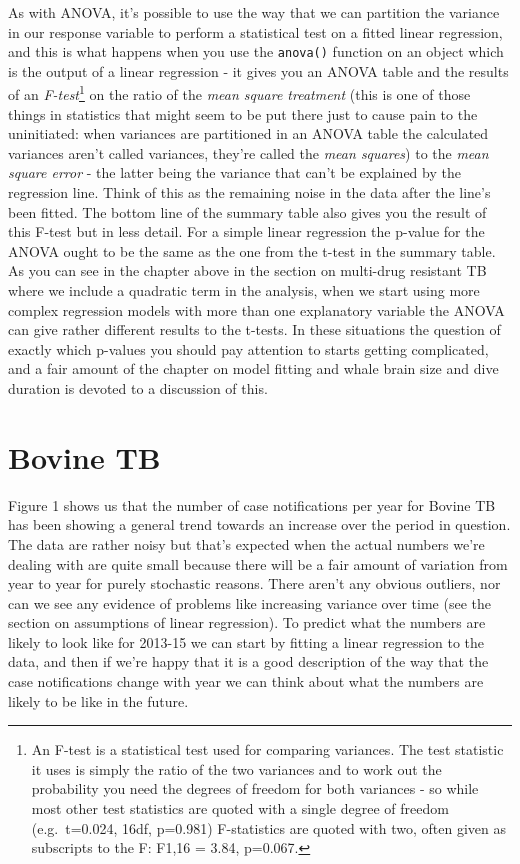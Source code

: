 \documentclass[
]{book}
\begin{document}
As with ANOVA, it's possible to use the way that we can partition the variance in our response variable to perform a statistical test on a fitted linear regression, and this is what happens when you use the \texttt{anova()} function on an object which is the output of a linear regression - it gives you an ANOVA table and the results of an \emph{F-test}\footnote{An F-test is a statistical test used for comparing variances. The test statistic it uses is simply the ratio of the two variances and to work out the probability you need the degrees of freedom for both variances - so while most other test statistics are quoted with a single degree of freedom (e.g.~t=0.024, 16df, p=0.981) F-statistics are quoted with two, often given as subscripts to the F: F1,16 = 3.84, p=0.067.} on the ratio of the \emph{mean square treatment} (this is one of those things in statistics that might seem to be put there just to cause pain to the uninitiated: when variances are partitioned in an ANOVA table the calculated variances aren't called variances, they're called the \emph{mean squares}) to the \emph{mean square error} - the latter being the variance that can't be explained by the regression line. Think of this as the remaining noise in the data after the line's been fitted. The bottom line of the summary table also gives you the result of this F-test but in less detail. For a simple linear regression the p-value for the ANOVA ought to be the same as the one from the t-test in the summary table. As you can see in the chapter above in the section on multi-drug resistant TB where we include a quadratic term in the analysis, when we start using more complex regression models with more than one explanatory variable the ANOVA can give rather different results to the t-tests. In these situations the question of exactly which p-values you should pay attention to starts getting complicated, and a fair amount of the chapter on model fitting and whale brain size and dive duration is devoted to a discussion of this.

\hypertarget{bovine-tb}{%
\section{Bovine TB}\label{bovine-tb}}

Figure 1 shows us that the number of case notifications per year for Bovine TB has been showing a general trend towards an increase over the period in question. The data are rather noisy but that's expected when the actual numbers we're dealing with are quite small because there will be a fair amount of variation from year to year for purely stochastic reasons. There aren't any obvious outliers, nor can we see any evidence of problems like increasing variance over time (see the section on assumptions of linear regression). To predict what the numbers are likely to look like for 2013-15 we can start by fitting a linear regression to the data, and then if we're happy that it is a good description of the way that the case notifications change with year we can think about what the numbers are likely to be like in the future.
\end{document}
